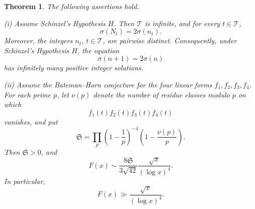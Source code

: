 \documentclass[10pt,a4paper]{amsart}
\newtheorem{theorem}{Theorem}
\begin{document}
\begin{theorem}\label{thm:conditional-family}
The following assertions hold.

\textup{(i)} Assume Schinzel's Hypothesis $H$. Then $\mathcal T$ is infinite, and for every $t\in\mathcal T$,
\[
\sigma(N_t)=2\sigma(n_t).
\]
Moreover, the integers $n_t$, $t\in\mathcal T$, are pairwise distinct. Consequently, under Schinzel's Hypothesis $H$, the equation
\[
\sigma(n+1)=2\sigma(n)
\]
has infinitely many positive integer solutions.

\textup{(ii)} Assume the Bateman--Horn conjecture for the four linear forms $f_1,f_2,f_3,f_4$. For each prime $p$, let $\nu(p)$ denote the number of residue classes modulo $p$ on which
\[
f_1(t)f_2(t)f_3(t)f_4(t)
\]
vanishes, and put
\[
\mathfrak S
=
\prod_p\left(1-\frac1p\right)^{-4}\left(1-\frac{\nu(p)}p\right).
\]
Then $\mathfrak S>0$, and
\[
F(x)
\sim
\frac{8\mathfrak S}{3\sqrt{42}}
\frac{\sqrt{x}}{(\log x)^4}.
\]
In particular,
\[
F(x)\gg\frac{\sqrt{x}}{(\log x)^4}.
\]
\end{theorem}
\end{document}
